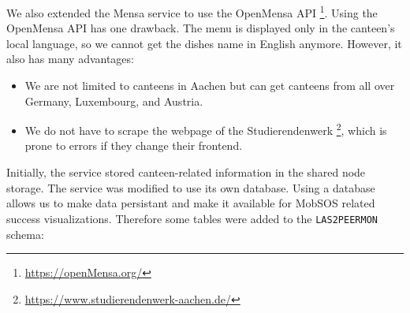We also extended the Mensa service to use the OpenMensa API \footnote{\url{https://openMensa.org/}}. 
Using the OpenMensa API has one drawback. The menu is displayed only in the canteen's local language, so we cannot get the dishes name in English anymore.
However, it also has many advantages:
\begin{itemize}
    \item We are not limited to canteens in Aachen but can get canteens from all over Germany, Luxembourg, and Austria. 
    \item We do not have to scrape the webpage of the Studierendenwerk \footnote{\url{https://www.studierendenwerk-aachen.de/}}, which is prone to errors if they change their frontend.
\end{itemize}
Initially, the service stored canteen-related information in the shared node storage. The service was modified to use its own database. Using a database allows us to make data persistant and make it available for MobSOS related success visualizations. 
Therefore some tables were added to the \texttt{LAS2PEERMON} schema:
